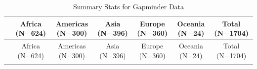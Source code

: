 \documentclass[
]{book}
\begin{document}
\begin{longtable}[]{@{}lcccccc@{}}
\caption{Summary Stats for Gapminder Data}\tabularnewline
\toprule
\begin{minipage}[b]{0.15\columnwidth}\raggedright
\strut
\end{minipage} & \begin{minipage}[b]{0.10\columnwidth}\centering
Africa (N=624)\strut
\end{minipage} & \begin{minipage}[b]{0.11\columnwidth}\centering
Americas (N=300)\strut
\end{minipage} & \begin{minipage}[b]{0.12\columnwidth}\centering
Asia (N=396)\strut
\end{minipage} & \begin{minipage}[b]{0.11\columnwidth}\centering
Europe (N=360)\strut
\end{minipage} & \begin{minipage}[b]{0.10\columnwidth}\centering
Oceania (N=24)\strut
\end{minipage} & \begin{minipage}[b]{0.12\columnwidth}\centering
Total (N=1704)\strut
\end{minipage}\tabularnewline
\midrule
\endfirsthead
\toprule
\begin{minipage}[b]{0.15\columnwidth}\raggedright
\strut
\end{minipage} & \begin{minipage}[b]{0.10\columnwidth}\centering
Africa (N=624)\strut
\end{minipage} & \begin{minipage}[b]{0.11\columnwidth}\centering
Americas (N=300)\strut
\end{minipage} & \begin{minipage}[b]{0.12\columnwidth}\centering
Asia (N=396)\strut
\end{minipage} & \begin{minipage}[b]{0.11\columnwidth}\centering
Europe (N=360)\strut
\end{minipage} & \begin{minipage}[b]{0.10\columnwidth}\centering
Oceania (N=24)\strut
\end{minipage} & \begin{minipage}[b]{0.12\columnwidth}\centering
Total (N=1704)\strut
\end{minipage}\tabularnewline
\midrule
\endhead
\begin{minipage}[t]{0.15\columnwidth}\raggedright

\end{minipage}
\end{longtable}
\end{document}
